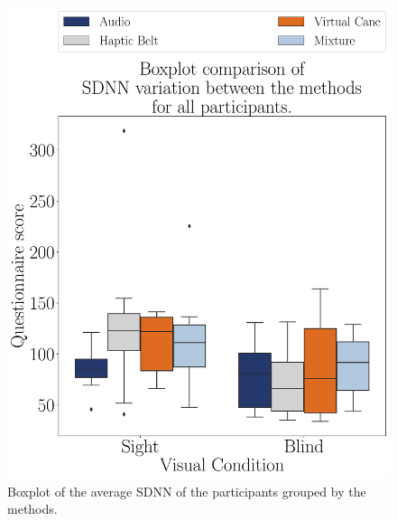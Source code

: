 \begin{figure}[!htb]
    \centering
    \begin{minipage}{0.45\textwidth}
        \centering
        \includegraphics[width = \textwidth]{Resultados/ECG/Figuras/pdf/boxplot_ecg_sdnn_4_scene.pdf}
        \caption{Boxplot of the average SDNN of the participants grouped by the methods.}
        \label{fig:boxplot_ecg_sdnn_4_scene}
    \end{minipage}
    \begin{minipage}{0.075\textwidth}
        \hfill
    \end{minipage}
    \begin{minipage}{0.45\textwidth}
        \centering

\end{minipage}
\end{figure}
